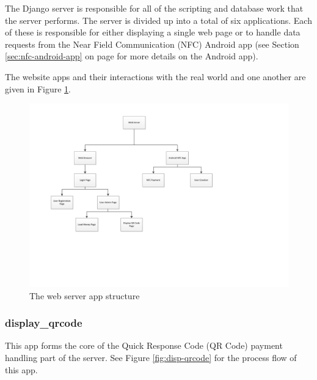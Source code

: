 The Django server is responsible for all of the scripting and database work that the server
performs. The server is divided up into a total of six applications. Each of these is
responsible for either displaying a single web page or to handle data requests from the
Near Field Communication (NFC) Android app (see Section \ref{sec:nfc-android-app} on
page \pageref{sec:nfc-android-app} for more details on the Android app).

The website apps and their interactions with the real world and one another
are given in Figure \ref{fig:website-apps}.

\begin{figure}
 \centering 
 \includegraphics[clip=true, trim = 0 130 130 30,
 scale=0.7]{website_structure}
 \caption{The web server app structure}
 \label{fig:website-apps}
\end{figure}

\subsubsection{display\_qrcode}

This app forms the core of the Quick Response Code (QR Code) payment handling part of the
server. See Figure \ref{fig:disp-qrcode} for the process
flow of this app.

